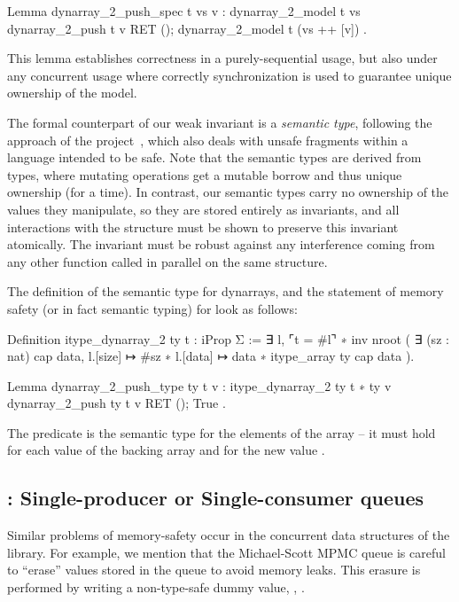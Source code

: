 \begin{coqcode}
Lemma dynarray_2_push_spec t vs v :
  {{{ dynarray_2_model t vs }}}
    dynarray_2_push t v
  {{{ RET (); dynarray_2_model t (vs ++ [v]) }}}.
\end{coqcode}

This lemma establishes correctness in a purely-sequential usage, but
also under any concurrent usage where correctly synchronization is used to
guarantee unique ownership of the model.

The formal counterpart of our weak invariant is a \emph{semantic type}, following the approach of the \RustBelt project~\citep*{rustbelt}, which also deals with unsafe fragments within a language intended to be safe. Note that the \RustBelt semantic types are derived from \Rust types, where mutating operations get a mutable borrow and thus unique ownership (for a time). In contrast, our semantic types carry no ownership of the values they manipulate, so they are stored entirely as invariants, and all interactions with the structure must be shown to preserve this invariant atomically. The invariant must be robust against any interference coming from any other function called in parallel on the same structure.

The definition of the semantic type for dynarrays, and the statement of memory safety (or in fact semantic typing) for  look as follows:
\begin{coqcode}
Definition itype_dynarray_2 ty t : iProp Σ :=
  ∃ l,
  ⌜t = #l⌝ ∗
  inv nroot (
    ∃ (sz : nat) cap data,
    l.[size] ↦ #sz ∗
    l.[data] ↦ data ∗ itype_array ty cap data
  ).

Lemma dynarray_2_push_type ty t v :
  {{{ itype_dynarray_2 ty t ∗ ty v }}}
    dynarray_2_push ty t v
  {{{ RET (); True }}}.
\end{coqcode}

The predicate  is the semantic type for the elements of the array -- it must hold for each value of the backing array and for the new value .


\subsection{\Saturn: Single-producer or Single-consumer queues}

Similar problems of memory-safety occur in the concurrent data structures of the \Saturn library. For example, we mention that the Michael-Scott MPMC queue is careful to ``erase'' values stored in the queue to avoid memory leaks. This erasure is performed by writing a non-type-safe dummy value, , .


